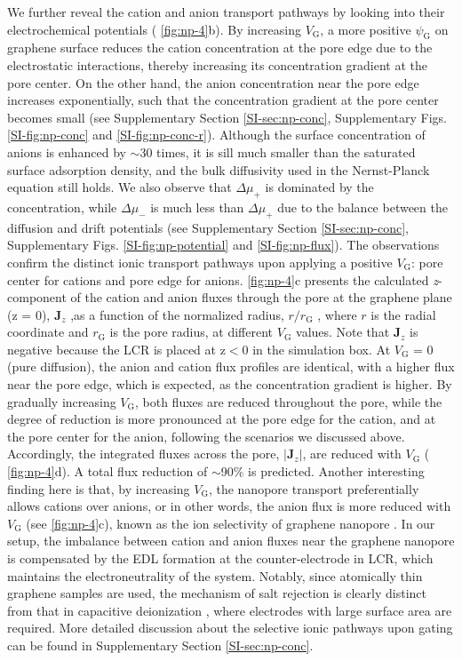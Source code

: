 We further reveal the cation and anion transport pathways by looking
into their electrochemical potentials ( \autoref{fig:np-4}b). By
increasing $V_{\mathrm{G}}$, a more positive $\psi_{\mathrm{G}}$ on
graphene surface reduces the cation concentration at the pore edge due
to the electrostatic interactions, thereby increasing its
concentration gradient at the pore center. On the other hand, the
anion concentration near the pore edge increases exponentially, such
that the concentration gradient at the pore center becomes small (see
{ Supplementary Section \autoref{SI-sec:np-conc}, Supplementary
Figs. \autoref{SI-fig:np-conc} and \autoref{SI-fig:np-conc-r}}).
{
Although the surface
concentration of anions is enhanced by $\sim{}$30 times, it is sill
much smaller than the saturated surface adsorption density, and the
bulk diffusivity used in the Nernst-Planck equation still holds.  We
also observe that $\Delta \mu_{+}$ is dominated by the concentration,
while $\Delta \mu_{-}$ is much less than $\Delta \mu_{+}$ due to the
balance between the diffusion and drift potentials (see Supplementary
Section \autoref{SI-sec:np-conc}, Supplementary Figs.  \autoref{SI-fig:np-potential}
and \autoref{SI-fig:np-flux})}. 
The observations confirm the distinct ionic
transport pathways upon applying a positive $V_{\mathrm{G}}$: pore
center for cations and pore edge for anions.  \autoref{fig:np-4}c
presents the calculated \textit{z}-component of the cation and anion
fluxes through the pore at the graphene plane (z = 0),
$\symbf{J}_{z}$ ,as a function of the normalized radius,
$r/r_{\mathrm{G}}$ , where $r$ is the radial coordinate and
$r_{\mathrm{G}}$ is the pore radius, at different $V_{\mathrm{G}}$
values. Note that $\symbf{J}_{z}$ is negative because the LCR is
placed at z$<$0 in the simulation box. At $V_{\mathrm{G}}$ = 0 (pure
diffusion), the anion and cation flux profiles are identical, with a
higher flux near the pore edge, which is expected, as the
concentration gradient is higher. By gradually increasing
$V_{\mathrm{G}}$, both fluxes are reduced throughout the pore, while
the degree of reduction is more pronounced at the pore edge for the
cation, and at the pore center for the anion, following the scenarios
we discussed above. Accordingly, the integrated fluxes across the
pore, $|\symbf{J}_{z}|$, are reduced with $V_{\mathrm{G}}$
( \autoref{fig:np-4}d). A total flux reduction of $\sim$90\% is
predicted. Another interesting finding here is that, by increasing
$V_{\mathrm{G}}$, the nanopore transport preferentially allows cations
over anions, or in other words, the anion flux is more reduced with
$V_{\mathrm{G}}$ (see  \autoref{fig:np-4}c), known as the ion
selectivity of graphene nanopore \cite{Rollings_2016_gating}. In our setup,
the imbalance between cation and anion fluxes near the graphene
nanopore is compensated by the EDL formation at the counter-electrode
in LCR, which maintains the electroneutrality of the system. Notably,
since atomically thin graphene samples are used, the mechanism of salt
rejection is clearly distinct from that in capacitive deionization
\cite{Biesheuvel_2010_desalin_theory}, where electrodes with large surface area are
required. 
{
More detailed discussion about the selective ionic pathways
upon gating can be found in Supplementary Section \autoref{SI-sec:np-conc}.}


